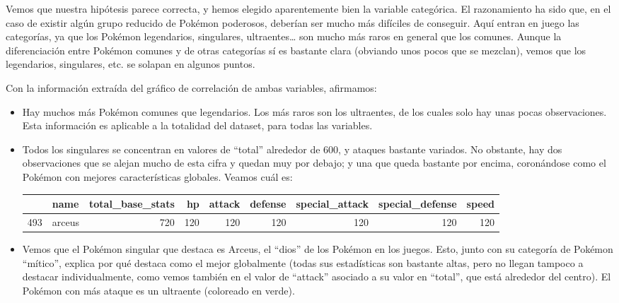 \documentclass[
  12pt,
]{extreport}
\begin{document}
Vemos que nuestra hipótesis parece correcta, y hemos elegido
aparentemente bien la variable categórica. El razonamiento ha sido que,
en el caso de existir algún grupo reducido de Pokémon poderosos,
deberían ser mucho más difíciles de conseguir. Aquí entran en juego las
categorías, ya que los Pokémon legendarios, singulares,
ultraentes\ldots{} son mucho más raros en general que los comunes.
Aunque la diferenciación entre Pokémon comunes y de otras categorías sí
es bastante clara (obviando unos pocos que se mezclan), vemos que los
legendarios, singulares, etc. se solapan en algunos puntos.

Con la información extraída del gráfico de correlación de ambas
variables, afirmamos:

\begin{itemize}
\item
  Hay muchos más Pokémon comunes que legendarios. Los más raros son los
  ultraentes, de los cuales solo hay unas pocas observaciones. Esta
  información es aplicable a la totalidad del dataset, para todas las
  variables.
\item
  Todos los singulares se concentran en valores de ``total'' alrededor
  de 600, y ataques bastante variados. No obstante, hay dos
  observaciones que se alejan mucho de esta cifra y quedan muy por
  debajo; y una que queda bastante por encima, coronándose como el
  Pokémon con mejores características globales. Veamos cuál es:

  \begin{table}[H]
  \centering\begingroup\fontsize{9.5}{11.5}\selectfont

  \begin{tabular}{llrrrrrrr}
  \toprule
    & name & total\_base\_stats & hp & attack & defense & special\_attack & special\_defense & speed\\
  \midrule
  493 & arceus & 720 & 120 & 120 & 120 & 120 & 120 & 120\\
  \bottomrule
  \end{tabular}
  \endgroup{}
  \end{table}
\item
  Vemos que el Pokémon singular que destaca es Arceus, el ``dios'' de
  los Pokémon en los juegos. Esto, junto con su categoría de Pokémon
  ``mítico'', explica por qué destaca como el mejor globalmente (todas
  sus estadísticas son bastante altas, pero no llegan tampoco a destacar
  individualmente, como vemos también en el valor de ``attack'' asociado
  a su valor en ``total'', que está alrededor del centro). El Pokémon
  con más ataque es un ultraente (coloreado en verde).


\end{itemize}
\end{document}
